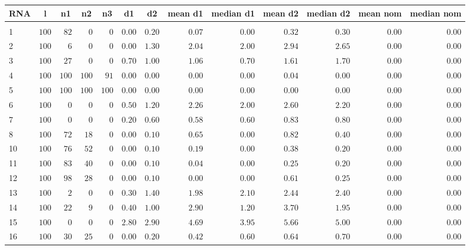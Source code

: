 \documentclass{article}
\begin{document}
\begin{landscape}
\begin{longtable}{lrrrrrrrrrrrr}
\hline\hline
\multicolumn{1}{c}{RNA}&\multicolumn{1}{c}{l}&\multicolumn{1}{c}{n1}&\multicolumn{1}{c}{n2}&\multicolumn{1}{c}{n3}&\multicolumn{1}{c}{d1}&\multicolumn{1}{c}{d2}&\multicolumn{1}{c}{mean d1}&\multicolumn{1}{c}{median d1}&\multicolumn{1}{c}{mean d2}&\multicolumn{1}{c}{median d2}&\multicolumn{1}{c}{mean nom}&\multicolumn{1}{c}{median nom}\\
\hline
&&&&&&&&&&&&\\
1&$100$&$ 82$&$  0$&$  0$&$0.00$&$0.20$&$0.07$&$0.00$&$0.32$&$0.30$&$0.00$&$0.00$\\
2&$100$&$  6$&$  0$&$  0$&$0.00$&$1.30$&$2.04$&$2.00$&$2.94$&$2.65$&$0.00$&$0.00$\\
3&$100$&$ 27$&$  0$&$  0$&$0.70$&$1.00$&$1.06$&$0.70$&$1.61$&$1.70$&$0.00$&$0.00$\\
4&$100$&$100$&$100$&$ 91$&$0.00$&$0.00$&$0.00$&$0.00$&$0.04$&$0.00$&$0.00$&$0.00$\\
5&$100$&$100$&$100$&$100$&$0.00$&$0.00$&$0.00$&$0.00$&$0.00$&$0.00$&$0.00$&$0.00$\\
6&$100$&$  0$&$  0$&$  0$&$0.50$&$1.20$&$2.26$&$2.00$&$2.60$&$2.20$&$0.00$&$0.00$\\
7&$100$&$  0$&$  0$&$  0$&$0.20$&$0.60$&$0.58$&$0.60$&$0.83$&$0.80$&$0.00$&$0.00$\\
8&$100$&$ 72$&$ 18$&$  0$&$0.00$&$0.10$&$0.65$&$0.00$&$0.82$&$0.40$&$0.00$&$0.00$\\
10&$100$&$ 76$&$ 52$&$  0$&$0.00$&$0.10$&$0.19$&$0.00$&$0.38$&$0.20$&$0.00$&$0.00$\\
11&$100$&$ 83$&$ 40$&$  0$&$0.00$&$0.10$&$0.04$&$0.00$&$0.25$&$0.20$&$0.00$&$0.00$\\
12&$100$&$ 98$&$ 28$&$  0$&$0.00$&$0.10$&$0.00$&$0.00$&$0.61$&$0.25$&$0.00$&$0.00$\\
13&$100$&$  2$&$  0$&$  0$&$0.30$&$1.40$&$1.98$&$2.10$&$2.44$&$2.40$&$0.00$&$0.00$\\
14&$100$&$ 22$&$  9$&$  0$&$0.40$&$1.00$&$2.90$&$1.20$&$3.70$&$1.95$&$0.00$&$0.00$\\
15&$100$&$  0$&$  0$&$  0$&$2.80$&$2.90$&$4.69$&$3.95$&$5.66$&$5.00$&$0.00$&$0.00$\\
16&$100$&$ 30$&$ 25$&$  0$&$0.00$&$0.20$&$0.42$&$0.60$&$0.64$&$0.70$&$0.00$&$0.00$\\

\end{longtable}
\end{landscape}
\end{document}
